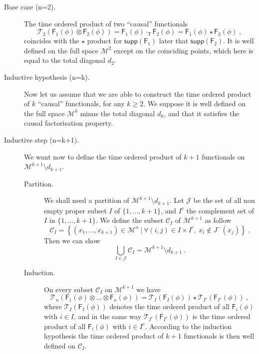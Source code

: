 \documentclass[11pt]{book}
\newcommand{\supp}{\mathsf{supp}}
\newcommand{\Ccal}{\mathcal{C}}
\newcommand{\Jcal}{\mathcal{J}}
\newcommand{\Mcal}{\mathcal{M}}
\newcommand{\Tcal}{\mathcal{T}}
\newcommand{\Fsf}{\mathsf{F}}
\newcommand{\Tsf}{\mathsf{T}}
\theoremstyle{break}
\begin{document}
\begin{description}


\item[Base case (n=2).] The time ordered product of two ``causal'' functionals 
%
\begin{equation*}
\Tcal_2\left(\Fsf_1(\phi)\otimes\Fsf_2(\phi)\right) = \Fsf_1(\phi) \cdot_\Tsf \Fsf_2(\phi) = \Fsf_1(\phi) \star \Fsf_2(\phi) \ ,
\end{equation*}
%
coincides with the $\star$ product for $\supp(\Fsf_1)$ later that $\supp(\Fsf_2)$. It is well defined on the full space $\Mcal^2$ except on the coinciding points, which here is equal to the total diagonal $d_2$.


\item[Inductive hypothesis (n=k).] Now let us assume that we are able to construct the time ordered product of $k$ ``causal'' functionals, for any $k\geq2$. We suppose it is well defined on the full space $\Mcal^k$ minus the total diagonal $d_k$, and that it satisfies the causal factorisation property. 


\item[Inductive step (n=k+1).] We want now to define the time ordered product of $k+1$ functionals on $\Mcal^{k+1}\setminus d_{k+1}$.


\begin{description}


\item[Partition.] We shall need a partition of $\Mcal^{k+1}\setminus d_{k+1}$. Let $\Jcal$ be the set of all non empty proper subset $I$ of $\{1,\dots,k+1\}$, and $I^c$ the complement set of $I$ in $\{1,\dots,k+1\}$. We define the subset $\Ccal_I$ of $\Mcal^{k+1}$ as follow
%
\begin{equation*}
\Ccal_I = \left\{ (x_1,\dots,x_{k+1}) \in \Mcal^n \ | \ \forall (i,j) \in I \times I^c , \ x_i \notin J^-(x_j) \right\} \ .
\end{equation*}
%
Then we can show \cite[lemma 4.1]{brunetti_microlocal_2000}
%
\begin{equation*}
\bigcup_{I \in \Jcal} \Ccal_I = \Mcal^{k+1} \setminus d_{k+1} \ .
\end{equation*}


\item[Induction.] On every subset $\Ccal_I$ on $\Mcal^{k+1}$ we have 
%
\begin{equation*}
\Tcal_n\left(\Fsf_1(\phi) \otimes \dots \otimes \Fsf_n(\phi) \right) = \Tcal_{I}\left(\Fsf_I(\phi)\right) \star \Tcal_{I^c}\left(\Fsf_{I^c}(\phi)\right) \ , 
\end{equation*}
%
where $\Tcal_{I}\left(\Fsf_I(\phi)\right)$ denotes the time ordered product of all $\Fsf_i(\phi)$ with $i \in I$, and in the same way $\Tcal_{I^c}\left(\Fsf_{I^c}(\phi)\right)$ is the time ordered product of all $\Fsf_i(\phi)$ with $i \in I^c$. According to the induction hypothesis the time ordered product of $k+1$ functionals is then well defined on $\Ccal_I$. 



\end{description}
\end{description}
\end{document}

